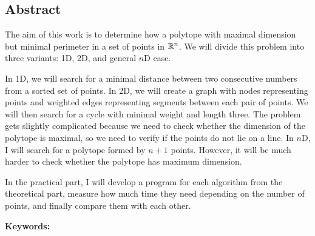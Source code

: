 \subsection*{Abstract}

The aim of this work is to determine how a polytope with maximal dimension but minimal perimeter in a set of points in $\mathbb{R}^n$. We will divide this problem into three variants: 1D, 2D, and general $n$D case. 

In 1D, we will search for a minimal distance between two consecutive numbers from a sorted set of points. In 2D, we will create a graph with nodes representing points and weighted edges representing segments between each pair of points. We will then search for a cycle with minimal weight and length three. The problem gets slightly complicated because we need to check whether the dimension of the polytope is maximal, so we need to verify if the points do not lie on a line. In $n$D, I will search for a polytope formed by $n+1$ points. However, it will be much harder to check whether the polytope has maximum dimension.

In the practical part, I will develop a program for each algorithm from the theoretical part, measure how much time they need depending on the number of points, and finally compare them with each other.

\vspace{1em}
\noindent
\textbf{Keywords: }\keywordsen

